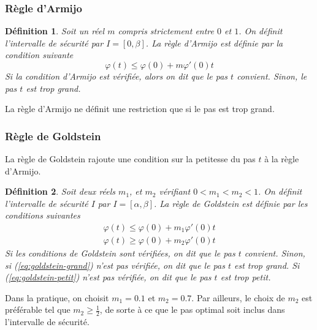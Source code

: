 \documentclass[3p, twocolumn]{elsarticle}
\newtheorem{definition}{Définition}[section]
\begin{document}
\subsubsection{Règle d'Armijo}
\begin{definition}
    Soit un réel $m$ compris strictement entre $0$ et $1$. On définit l'intervalle de sécurité par $I=[0,\beta]$. La règle d'Armijo est définie par la condition suivante
    \begin{equation}
        \varphi(t) \leq \varphi(0) + m\varphi'(0)t
        \label{eq:armijo}
    \end{equation}
    Si la condition d'Armijo est vérifiée, alors on dit que le pas $t$ convient. Sinon, le pas $t$ est trop grand.
\end{definition}
\begin{rmk}
    La règle d'Armijo ne définit une restriction que si le pas est trop grand. 
\end{rmk}
\subsubsection{Règle de Goldstein}
La règle de Goldstein rajoute une condition sur la petitesse du pas $t$ à la règle d'Armijo.
\begin{definition}
    Soit deux réels $m_1$, et $m_2$ vérifiant $0<m_1<m_2<1$. On définit l'intervalle de sécurité $I$ par $I=[\alpha,\beta]$. La règle de Goldstein est définie par les conditions suivantes
    \begin{align}
        \varphi(t) \leq \varphi(0) + m_1\varphi'(0)t
        \label{eq:goldstein-grand}\\
        \varphi(t) \geq \varphi(0) + m_2\varphi'(0)t
        \label{eq:goldstein-petit}
    \end{align}
    Si les conditions de Goldstein sont vérifiées, on dit que le pas $t$ convient. Sinon, si (\ref{eq:goldstein-grand}) n'est pas vérifiée, on dit que le pas $t$ est trop grand. Si (\ref{eq:goldstein-petit}) n'est pas vérifiée, on dit que le pas $t$ est trop petit.
\end{definition}
\begin{rmk}
    Dans la pratique, on choisit $m_1=0.1$ et $m_2 = 0.7$. Par ailleurs, le choix de $m_2$ est préférable tel que $m_2\geq \frac12$, de sorte à ce que le pas optimal soit inclus dans l'intervalle de sécurité.
\end{rmk}
\end{document}
